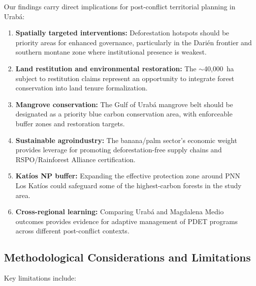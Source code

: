 \documentclass[12pt,a4paper]{article}
\begin{document}
Our findings carry direct implications for post-conflict territorial planning in Urab\'{a}:

\begin{enumerate}[label=\arabic*.]
\item \textbf{Spatially targeted interventions:} Deforestation hotspots should be priority areas for enhanced governance, particularly in the Dari\'{e}n frontier and southern montane zone where institutional presence is weakest.
\item \textbf{Land restitution and environmental restoration:} The ${\sim}$40,000~ha subject to restitution claims represent an opportunity to integrate forest conservation into land tenure formalization.
\item \textbf{Mangrove conservation:} The Gulf of Urab\'{a} mangrove belt should be designated as a priority blue carbon conservation area, with enforceable buffer zones and restoration targets.
\item \textbf{Sustainable agroindustry:} The banana/palm sector's economic weight provides leverage for promoting deforestation-free supply chains and RSPO/Rainforest Alliance certification.
\item \textbf{Kat\'{i}os NP buffer:} Expanding the effective protection zone around PNN Los Kat\'{i}os could safeguard some of the highest-carbon forests in the study area.
\item \textbf{Cross-regional learning:} Comparing Urab\'{a} and Magdalena Medio outcomes provides evidence for adaptive management of PDET programs across different post-conflict contexts.
\end{enumerate}

\subsection{Methodological Considerations and Limitations}

Key limitations include:
\end{document}
